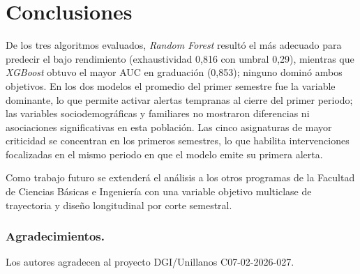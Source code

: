 \documentclass[runningheads]{llncs}
\begin{document}
\FloatBarrier
 
 
\section{Conclusiones}
 
De los tres algoritmos evaluados, \textit{Random Forest} resultó el más adecuado
para predecir el bajo rendimiento (exhaustividad 0,816 con umbral
0,29), mientras que \textit{XGBoost} obtuvo el mayor AUC en graduación (0,853);
ninguno dominó ambos objetivos. En los dos
modelos el promedio del primer semestre fue la variable dominante, lo
que permite activar alertas tempranas al cierre del primer periodo; las
variables sociodemográficas y familiares no mostraron diferencias ni
asociaciones significativas en esta población. Las cinco asignaturas de
mayor criticidad se concentran en los primeros semestres, lo que
habilita intervenciones focalizadas en el mismo periodo en que el
modelo emite su primera alerta.
 
Como trabajo futuro se extenderá el análisis a los otros programas de la
Facultad de Ciencias Básicas e Ingeniería con una variable objetivo multiclase de trayectoria y diseño longitudinal por corte semestral.
 
\subsubsection{Agradecimientos.} Los autores agradecen al proyecto
DGI/Unillanos C07-02-2026-027.
 
\end{document}
